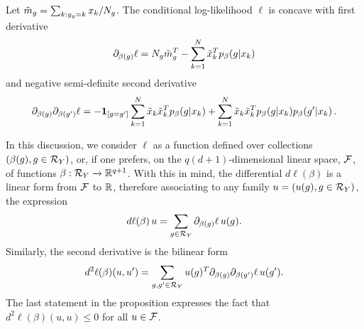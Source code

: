 \begin{proposition}
\label{prop:log.reg}
Let  ${\tilde{m}}_{g} = \sum_{k:y_{g}=k} x_{k}/N_{g}$.
The conditional log-likelihood $\ell$ is concave with first derivative
\begin{equation}
\label{eq:log.reg.d1}
\partial_{\beta(g)} \ell  = N_{g} {\tilde{m}}^{T}_{g} -\sum_{k=1}^{N} 
\tilde x_{k}^T p_\beta(g|x_{k})
\end{equation}
and negative semi-definite second derivative
\begin{equation}
\label{eq:log.reg.d2}
\partial_{\beta(g)}\partial_{\beta(g')} \ell =  -{\bm 1}_{[g=g']}\sum_{k=1}^{N}\tilde x_{k} \tilde x_{k}^T
 p_\beta(g|x_{k}) + \sum_{k=1}^{N}
\tilde x_{k} \tilde x^T_{k} p_\beta(g|x_{k}) p_\beta(g'|x_{k})\,.
\end{equation}
\end{proposition}
\begin{remark}
\label{rem:log.reg.notation}
In this discussion, we consider $\ell$ as a function defined over collections $(\beta(g), g\in {\mathcal R}_Y)$, or, if one prefers, on the $q(d+1)$-dimensional linear space, ${\mathcal F}$, of functions $\beta: {\mathcal R}_Y \to {\mathbb{R}}^{q+1}$. With this in mind, the differential $d\ell(\beta)$ is a linear form from ${\mathcal F}$ to ${\mathbb{R}}$, therefore associating to any family $u = (u(g), g\in{\mathcal R}_Y)$, the expression
\[
d\ell(\beta) \,u = \sum_{g\in{\mathcal R}_Y} \partial_{\beta(g)} \ell\, u(g).
\]
Similarly, the second derivative is the bilinear form
\[
d^2\ell(\beta)(u,u') = \sum_{g, g'\in{\mathcal R}_Y} u(g)^T \partial_{\beta(g)}\partial_{\beta(g')}\ell \, u(g').
\]
The last statement in the proposition expresses the fact that $d^2\ell(\beta)(u,u) \leq 0$ for all $u\in{\mathcal F}$.
\end{remark}
